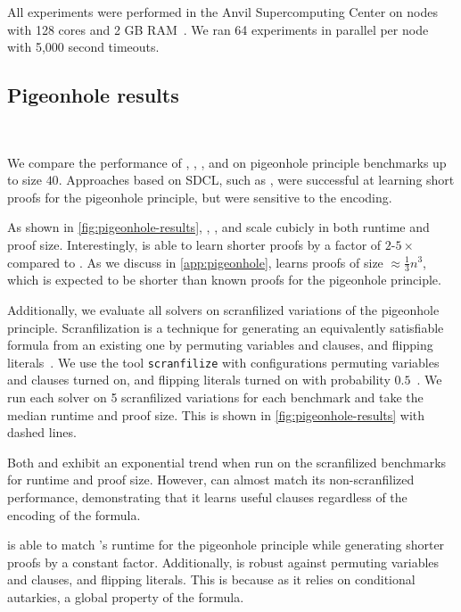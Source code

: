 All experiments were performed in the Anvil Supercomputing Center on nodes with
128 cores and 2 GB RAM~\cite{anvil}. We ran 64 experiments in parallel per node
with 5,000 second timeouts.

\subsection{Pigeonhole results}~\label{subsec:eval-pigeonhole}

We compare the performance of \tool, \cadical, \sadical, and \prelearn on
pigeonhole principle benchmarks up to size $40$. Approaches based on SDCL, such
as \sadical, were successful at learning short proofs for the pigeonhole
principle, but were sensitive to the encoding.

As shown in \autoref{fig:pigeonhole-results}, \prelearn, \sadical, and \tool scale cubicly
in both runtime and proof size. Interestingly, \tool is able to learn shorter
proofs by a factor of $2$-$5\times$ compared to \sadical. As we discuss in
\autoref{app:pigeonhole}, \tool learns proofs of size $\approx \frac13 n^3$,
which is expected to be shorter than known \pr proofs for the pigeonhole principle.

Additionally, we evaluate all solvers on scranfilized variations of the
pigeonhole principle. Scranfilization is a technique for generating an
equivalently satisfiable formula from an existing one by permuting variables and clauses, and flipping literals~\cite{scranfilize}. We use the tool
\texttt{scranfilize} with configurations permuting variables and clauses turned on, and flipping literals turned on with
probability $0.5$~\cite{scranfilize}. We run each solver on 5 scranfilized variations for
each benchmark and take the median runtime and proof size. This is shown in \autoref{fig:pigeonhole-results} with dashed lines.


Both \sadical and \cadical exhibit an exponential trend when run on the scranfilized benchmarks for runtime and proof size. However, \tool can almost match its non-scranfilized performance, demonstrating that it learns useful \pr clauses regardless of the encoding of the formula.

\tool is able to match \sadical's runtime for the pigeonhole principle while
generating shorter proofs by a constant factor. Additionally, \tool is robust against permuting variables and clauses, and flipping literals.
This is because as it relies on conditional autarkies, a global property of the formula.


